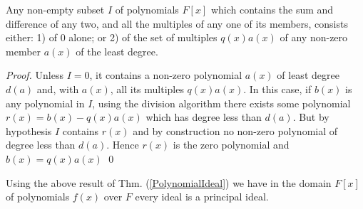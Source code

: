\begin{theorem}
Any non-empty subset $I$ of polynomials $F[x]$ which contains the sum and difference of any two, and all the multiples of any one of its members, consists either: 1) of 0 alone; or 2) of the set of multiples $q(x) a(x)$ of any non-zero member 
$a(x)$ of the least degree.  \label{PolynomialIdeal}
\end{theorem}
\begin{proof}
Unless $I = 0$, it contains a non-zero polynomial $a(x)$ of least degree $d(a)$ and, with $a(x)$, all its multiples $q(x)a(x)$.  In this case, if $b(x)$ is any polynomial in $I$, using the division algorithm there exists some polynomial 
$r(x) = b(x) - q(x) a(x)$ which has degree less than $d(a)$. But by hypothesis $I$ contains $r(x)$ and by construction no non-zero polynomial of degree less than $d(a)$. Hence $r(x)$ is the zero polynomial and $b(x) = q(x) a(x)$ \qed
\end{proof}

Using the above result of Thm. (\ref{PolynomialIdeal}) we have in the domain $F[x]$ of polynomials $f(x)$ over $F$ every ideal is a principal ideal. 